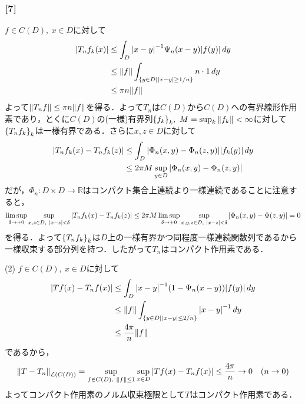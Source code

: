 \documentclass[a4j]{ltjsarticle}
\newcommand{\Rset}{\mathbb{R}}
\newcommand{\1}{\mathbbm{1}}
\numberwithin{equation}{section}
\theoremstyle{definition}
\begin{document}
\subsubsection*{[7]}
$f\in C(D),\ x\in D$に対して
\begin{align}
    \abs{T_nf_k(x)}&\leq \int_{D}\abs{x-y}^{-1}\Psi_n(x-y)\abs{f(y)}\,dy\\
    &\leq \norm{f}\int_{\qty{y\in D\mid \abs{x-y}\geq 1/n}}n\cdot 1\,dy\\
    &\leq \pi n \norm{f} 
\end{align}
よって$\norm{T_nf}\leq \pi n\norm{f}$を得る．よって$T_n$は$C(D)$から$C(D)$への有界線形作用素であり，とくに$C(D)$の(一様)有界列$\qty{f_k}_k,\ M=\sup_{k}\norm{f_k}<\infty$に対して$\qty{T_nf_k}_k$は一様有界である．さらに$x,z\in D$に対して
\begin{align}
    \abs{T_nf_k(x)-T_nf_k(z)}&\leq \int_{D}\abs{\Phi_n(x,y)-\Phi_n(z,y)}\abs{f_k(y)}\,dy\\
    &\leq 2\pi M\sup_{y\in D}\abs{\Phi_n(x,y)-\Phi_n(z,y)}
\end{align}
だが，$\Phi_n\colon D\times D\to \Rset$はコンパクト集合上連続より一様連続であることに注意すると，
\begin{equation}
    \limsup_{\delta\to +0}\sup_{x,z\in D,\ \abs{x-z}<\delta}\abs{T_nf_k(x)-T_nf_k(z)}\leq 2\pi M\limsup_{\delta\to+0}\sup_{x,y,z\in D,\ \abs{x-z}<\delta}\abs{\Phi_n(x,y)-\Phi(z,y)}=0 
\end{equation}
を得る．よって$\qty{T_nf_k}_k$は$D$上の一様有界かつ同程度一様連続関数列であるから一様収束する部分列を持つ．したがって$T_n$はコンパクト作用素である．

(2) $f\in C(D),\ x\in D$に対して 
\begin{align}
    \abs{Tf(x)-T_nf(x)}
    &\leq \int_{D}\abs{x-y}^{-1}\qty(1-\Psi_{n}(x-y))\abs{f(y)}\,dy\\
    &\leq \norm{f}\int_{\qty{y\in D\mid \abs{x-y}\leq 2/n}}\abs{x-y}^{-1}\,dy\\
    &\leq \frac{4\pi}{n}\norm{f}
\end{align}
であるから，
\begin{equation}
    \norm{T-T_n}_{\mathcal{L}(C(D))}=\sup_{f\in C(D),\ \norm{f}\leq 1}\sup_{x\in D}\abs{Tf(x)-T_nf(x)}\leq \frac{4\pi}{n}\to0\quad (n\to 0)
\end{equation}
よってコンパクト作用素のノルム収束極限として$T$はコンパクト作用素である．
\end{document}
